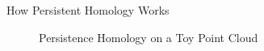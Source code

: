 \documentclass[final]{beamer}
\newlength{\colwidth}
\begin{document}
\begin{frame}[t]
\begin{columns}[t]
\begin{column}{\colwidth}
\begin{block} {How Persistent Homology Works}
\begin{enumerate}
    \end{enumerate}

    \begin{figure}[h]
        \begin{center}
            
        \end{center}
        \caption{Persistence Homology on a Toy Point Cloud}
    \end{figure}

    

            
    \end{block}

\end{column}





    





\end{columns}
\end{frame}
\end{document}
